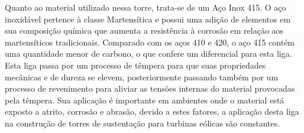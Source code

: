   Quanto ao material utilizado nessa torre, trata-se de um Aço Inox 415. O aço inoxidável pertence à classe Martensítica e possui uma adição de elementos em sua composição química que aumenta a resistência à corrosão em relação aos martensíticos tradicionais. Comparado com os aços 410 e 420, o aço 415 contém uma quantidade menor de carbono, o que confere um diferencial para esta liga. Esta liga passa por um processo de têmpera para  que suas propriedades mecânicas e de dureza se elevem, posteriormente passando também por um processo de revenimento para aliviar as tensões internas do material provocadas pela têmpera. Sua aplicação é importante em ambientes onde o material está exposto a atrito, corrosão e abrasão, devido a estes fatores, a aplicação desta liga na construção de torres de sustentação para turbinas eólicas são constantes.\footnotemark
   